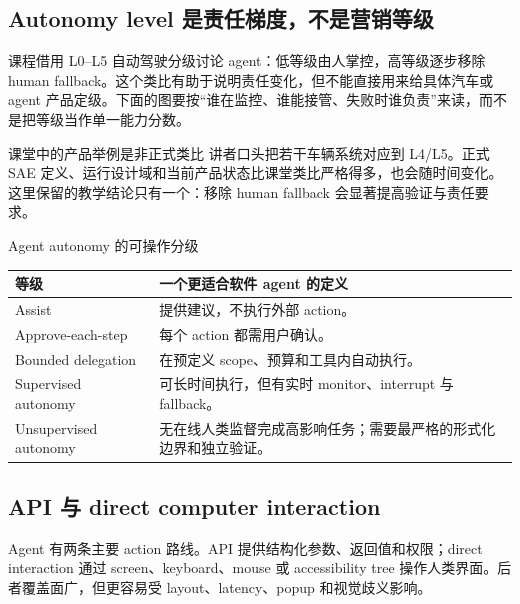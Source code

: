 \subsection{Autonomy level 是责任梯度，不是营销等级}

课程借用 L0--L5 自动驾驶分级讨论 agent：低等级由人掌控，高等级逐步移除 human fallback。这个类比有助于说明责任变化，但不能直接用来给具体汽车或 agent 产品定级。下面的图要按“谁在监控、谁能接管、失败时谁负责”来读，而不是把等级当作单一能力分数。


\begin{warningbox}{课堂中的产品举例是非正式类比}
讲者口头把若干车辆系统对应到 L4/L5。正式 SAE 定义、运行设计域和当前产品状态比课堂类比严格得多，也会随时间变化。这里保留的教学结论只有一个：移除 human fallback 会显著提高验证与责任要求。
\end{warningbox}

\begin{knowledgebox}{Agent autonomy 的可操作分级}
\begin{tabularx}{\textwidth}{L{0.17\textwidth} X}
\toprule
等级 & 一个更适合软件 agent 的定义 \\
\midrule
Assist & 提供建议，不执行外部 action。 \\
Approve-each-step & 每个 action 都需用户确认。 \\
Bounded delegation & 在预定义 scope、预算和工具内自动执行。 \\
Supervised autonomy & 可长时间执行，但有实时 monitor、interrupt 与 fallback。 \\
Unsupervised autonomy & 无在线人类监督完成高影响任务；需要最严格的形式化边界和独立验证。 \\
\bottomrule
\end{tabularx}
\end{knowledgebox}

\subsection{API 与 direct computer interaction}

Agent 有两条主要 action 路线。API 提供结构化参数、返回值和权限；direct interaction 通过 screen、keyboard、mouse 或 accessibility tree 操作人类界面。后者覆盖面广，但更容易受 layout、latency、popup 和视觉歧义影响。


